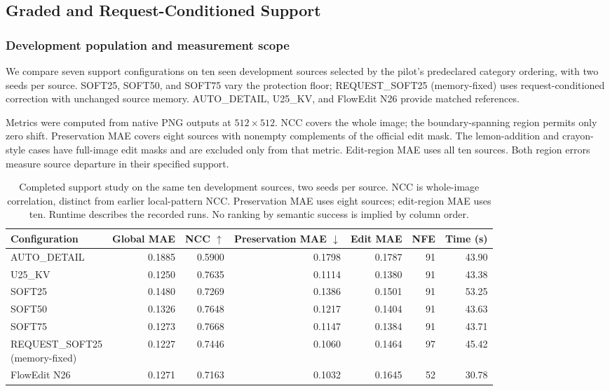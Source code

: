\subsection{Graded and Request-Conditioned Support}
\label{sec:support-results}
\subsubsection{Development population and measurement scope}
We compare seven support configurations on ten seen development sources selected by the pilot's predeclared category ordering, with two seeds per source. SOFT25, SOFT50, and SOFT75 vary the protection floor; REQUEST\_SOFT25 (memory-fixed) uses request-conditioned correction with unchanged source memory. AUTO\_DETAIL, U25\_KV, and FlowEdit N26 provide matched references.

Metrics were computed from native PNG outputs at $512\times512$. NCC covers the whole image; the boundary-spanning region permits only zero shift. Preservation MAE covers eight sources with nonempty complements of the official edit mask. The lemon-addition and crayon-style cases have full-image edit masks and are excluded only from that metric. Edit-region MAE uses all ten sources. Both region errors measure source departure in their specified support.

\begin{table}[t]
\centering\small
\caption{Completed support study on the same ten development sources, two seeds per source. NCC is whole-image correlation, distinct from earlier local-pattern NCC. Preservation MAE uses eight sources; edit-region MAE uses ten. Runtime describes the recorded runs. No ranking by semantic success is implied by column order.}
\label{tab:r82-results}
\begin{tabular}{lrrrrrr}
\toprule
Configuration & Global MAE & NCC $\uparrow$ & Preservation MAE $\downarrow$ & Edit MAE & NFE & Time (s)\\
\midrule
AUTO\_DETAIL & 0.1885 & 0.5900 & 0.1798 & 0.1787 & 91 & 43.90\\
U25\_KV & 0.1250 & 0.7635 & 0.1114 & 0.1380 & 91 & 43.38\\
SOFT25 & 0.1480 & 0.7269 & 0.1386 & 0.1501 & 91 & 53.25\\
SOFT50 & 0.1326 & 0.7648 & 0.1217 & 0.1404 & 91 & 43.63\\
SOFT75 & 0.1273 & 0.7668 & 0.1147 & 0.1384 & 91 & 43.71\\
\shortstack[l]{REQUEST\_SOFT25\\(memory-fixed)} & 0.1227 & 0.7446 & 0.1060 & 0.1464 & 97 & 45.42\\
FlowEdit N26 & 0.1271 & 0.7163 & 0.1032 & 0.1645 & 52 & 30.78\\
\bottomrule
\end{tabular}
\end{table}

